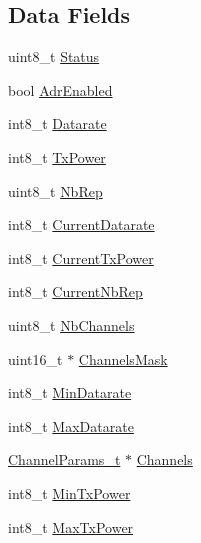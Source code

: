 \subsection*{Data Fields}
\begin{DoxyCompactItemize}
\item 
uint8\+\_\+t \hyperlink{structsRegionCommonLinkAdrReqVerifyParams_a429bbd69fae4c3642bf14bd1efa04ea2}{Status}
\item 
bool \hyperlink{structsRegionCommonLinkAdrReqVerifyParams_afd03766c72f58d11c674a206cfdb4d4a}{Adr\+Enabled}
\item 
int8\+\_\+t \hyperlink{structsRegionCommonLinkAdrReqVerifyParams_af3fe2cfebe5e97ac38bf3402eb575bc1}{Datarate}
\item 
int8\+\_\+t \hyperlink{structsRegionCommonLinkAdrReqVerifyParams_adbb4536c7f3a4672f9888c346b6200a5}{Tx\+Power}
\item 
uint8\+\_\+t \hyperlink{structsRegionCommonLinkAdrReqVerifyParams_a7230a0b5bb9a47a669ed568d8c3f376f}{Nb\+Rep}
\item 
int8\+\_\+t \hyperlink{structsRegionCommonLinkAdrReqVerifyParams_aeebccbc2f20b9b3bde89161b0780a532}{Current\+Datarate}
\item 
int8\+\_\+t \hyperlink{structsRegionCommonLinkAdrReqVerifyParams_a25d09502bab2de48433c35515aeb4032}{Current\+Tx\+Power}
\item 
int8\+\_\+t \hyperlink{structsRegionCommonLinkAdrReqVerifyParams_ac9f4e60bb78a62b3adc5fc7fee4b53fd}{Current\+Nb\+Rep}
\item 
uint8\+\_\+t \hyperlink{structsRegionCommonLinkAdrReqVerifyParams_a47f2063a20ecefe952d0deacccf8c76f}{Nb\+Channels}
\item 
uint16\+\_\+t $\ast$ \hyperlink{structsRegionCommonLinkAdrReqVerifyParams_afe91eaf70011a2894b570ce7d041df67}{Channels\+Mask}
\item 
int8\+\_\+t \hyperlink{structsRegionCommonLinkAdrReqVerifyParams_a2166f3c4240c96cd8478b46e1c34d201}{Min\+Datarate}
\item 
int8\+\_\+t \hyperlink{structsRegionCommonLinkAdrReqVerifyParams_a58a01a8c8400c4bfe2c2be665997eb6d}{Max\+Datarate}
\item 
\hyperlink{group__LORAMAC_ga1360ca6f82c6d125ea43a9dad9b56184}{Channel\+Params\+\_\+t} $\ast$ \hyperlink{structsRegionCommonLinkAdrReqVerifyParams_ad6a30685c21f172138b016e50f4e7e6f}{Channels}
\item 
int8\+\_\+t \hyperlink{structsRegionCommonLinkAdrReqVerifyParams_ae3c2f43bcdfce1e8cc4f0ec73f7b7ff6}{Min\+Tx\+Power}
\item 
int8\+\_\+t \hyperlink{structsRegionCommonLinkAdrReqVerifyParams_ace9e3769fec574c047fefbbca55e74da}{Max\+Tx\+Power}
\end{DoxyCompactItemize}


